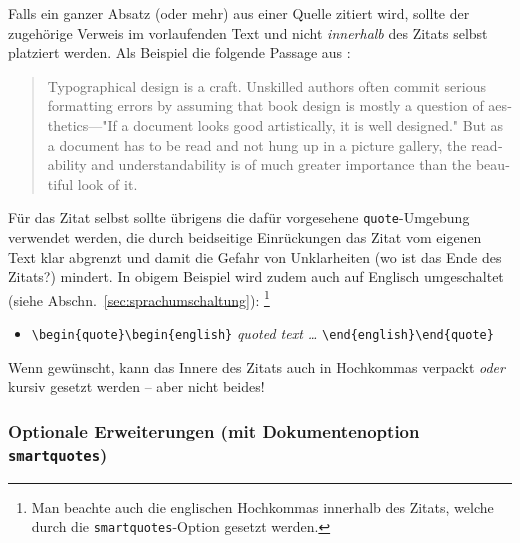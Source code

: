Falls ein ganzer Absatz (oder mehr) aus einer Quelle zitiert wird, sollte der
zugehörige Verweis im vorlaufenden Text und nicht \emph{innerhalb} des Zitats selbst
platziert werden. Als Beispiel die folgende Passage aus \cite{Oetiker2021}:
%
\begin{quote}
    \begin{english}
        Typographical design is a craft. Unskilled authors often
        commit serious formatting errors by assuming that book
        design is mostly a question of aesthetics---"If a document
        looks good artistically, it is well designed." But as a
        document has to be read and not hung up in a picture
        gallery, the readability and understandability is of much
        greater importance than the beautiful look of it.
    \end{english}
\end{quote}
%
Für das Zitat selbst sollte übrigens die dafür vorgesehene
\texttt{quote}-Umgebung verwendet werden, die durch beidseitige Einrückungen
das Zitat vom eigenen Text klar abgrenzt und damit die Gefahr von
Unklarheiten (wo ist das Ende des Zitats?) mindert. In obigem Beispiel wird
zudem auch auf Englisch umgeschaltet (siehe Abschn.\
\ref{sec:sprachumschaltung}):%
\footnote{Man beachte auch die englischen Hochkommas innerhalb
des Zitats, welche durch die \texttt{smartquotes}-Option gesetzt werden.}
%
\begin{itemize}
    \item[] \verb!\begin{quote}\begin{english}! \emph{quoted text \ldots}
    \verb!\end{english}\end{quote}!
\end{itemize}
%
Wenn gewünscht, kann das Innere des Zitats auch in Hochkommas verpackt
\emph{oder} kursiv gesetzt werden -- aber nicht beides!


\subsubsection{Optionale Erweiterungen (mit Dokumentenoption
\texttt{smartquotes})}

